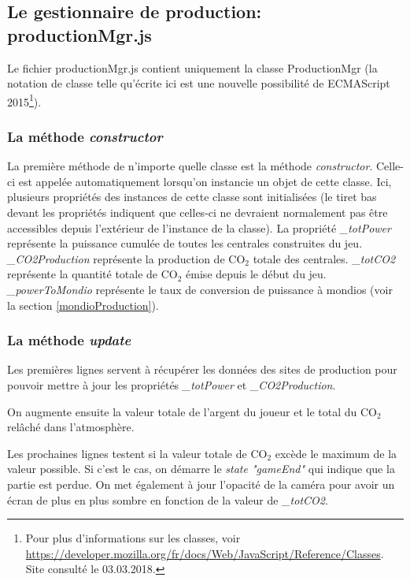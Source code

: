 \documentclass{article}
\begin{document}
		
		\subsection{Le gestionnaire de production: productionMgr.js} \label{productionMgr}
		
		Le fichier productionMgr.js contient uniquement la classe ProductionMgr (la notation de classe telle qu'écrite ici est une nouvelle possibilité de ECMAScript 2015\footnote{Pour plus d'informations sur les classes, voir \url{https://developer.mozilla.org/fr/docs/Web/JavaScript/Reference/Classes}. Site consulté le 03.03.2018.}).
		
		\subsubsection{La méthode \textit{constructor}}
		La première méthode de n'importe quelle classe est la méthode \textit{constructor}. Celle-ci est appelée automatiquement lorsqu'on instancie un objet de cette classe. Ici,  plusieurs propriétés des instances de cette classe sont initialisées (le tiret bas devant les propriétés indiquent que celles-ci ne devraient normalement pas être accessibles depuis l'extérieur de l'instance de la classe). La propriété \textit{\_totPower} représente la puissance cumulée de toutes les centrales construites du jeu. \textit{\_CO2Production} représente la production de CO$_{2}$ totale des centrales. \textit{\_totCO2} représente la quantité totale de CO$_{2}$ émise depuis le début du jeu. \textit{\_powerToMondio} représente le taux de conversion de puissance à mondios (voir la section \ref{mondioProduction}).
		
		\subsubsection{La méthode \textit{update}}
		Les premières lignes servent à récupérer les données des sites de production pour pouvoir mettre à jour les propriétés \textit{\_totPower} et \textit{\_CO2Production}. 
		
		
		On augmente ensuite la valeur totale de l'argent du joueur et le total du CO$_{2}$ relâché dans l'atmosphère.
		
		
		Les prochaines lignes testent si la valeur totale de CO$_{2}$ excède le maximum de la valeur possible. Si c'est le cas, on démarre le \textit{state "gameEnd"} qui indique que la partie est perdue. On met également à jour l'opacité de la caméra pour avoir un écran de plus en plus sombre en fonction de la valeur de \textit{\_totCO2}.
		
\end{document}
